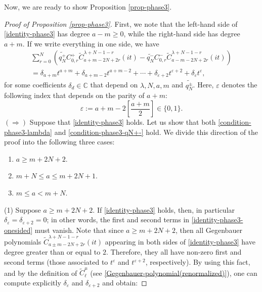 \documentclass[12pt, pdflatex, a4paper]{article}
\theoremstyle{plain}
\theoremstyle{definition}
\def\C{{\mathbb C}}
\def\Geg{\widetilde{C}}
\begin{document}
Now, we are ready to show Proposition \ref{prop-phase3}.

\begin{proof}[Proof of Proposition \ref{prop-phase3}]
First, we note that the left-hand side of \eqref{identity-phase3} has degree $a-m \geq 0$, while the right-hand side has degree $a+m$. If we write everything in one side, we have
\begin{equation}\label{identity-phase3-onesided}
\begin{aligned}
\sum_{r=0}^{N}\left(\widetilde{q_N^+}C_{0,r}^+\Geg_{a+m-2N+2r}^{\lambda+N-1-r}(it) -\widetilde{q_N^-}C_{0,r}^-\Geg_{a-m-2N+2r}^{\lambda+N-1-r}(it)\right) \\
= \delta_{a+m} t^{a+m} + \delta_{a+m-2} t^{a+m-2} + \cdots + \delta_{\varepsilon+2} t^{\varepsilon+2} + \delta_\varepsilon t^\varepsilon, 
\end{aligned}
\end{equation}
for some coefficients $\delta_d \in \C$ that depend on $\lambda, N,  a, m$ and $\widetilde{q_N^\pm}$. Here, $\varepsilon$ denotes the following index that depends on the parity of $a+m$:
\begin{equation*}
\varepsilon := a+m-2\left[\frac{a+m}{2}\right]\in\{0, 1\}.
\end{equation*}
$(\Rightarrow)$ Suppose that \eqref{identity-phase3} holds. Let us show that both \eqref{condition-phase3-lambda} and \eqref{condition-phase3-qN+-} hold. We divide this direction of the proof into the following three cases:
\begin{enumerate}[label=\normalfont{(\arabic*)}]
\item $a \geq m+2N+2$.
\item $m+N \leq a \leq m+2N+1$.
\item $m \leq a < m+N$.
\end{enumerate}
(1) Suppose $a \geq m+2N+2$. If \eqref{identity-phase3} holds, then, in particular $\delta_\varepsilon = \delta_{\varepsilon+2} = 0$; in other words, the first and second terms in \eqref{identity-phase3-onesided} must vanish. Note that since $a \geq m+2N+2$, then all Gegenbauer polynomials $\Geg_{a\pm m-2N+2r}^{\lambda+N-1-r}(it)$ appearing in both sides of \eqref{identity-phase3} have degree greater than or equal to $2$. Therefore, they all have non-zero first and second terms (those associated to $t^\varepsilon$ and $t^{\varepsilon+2}$, respectively). By using this fact, and by the definition of $\Geg_{\ell}^\mu$ (see \eqref{Gegenbauer-polynomial(renormalized)}), one can compute explicitly $\delta_\varepsilon$ and $\delta_{\varepsilon+2}$ and obtain:

\end{proof}
\end{document}
